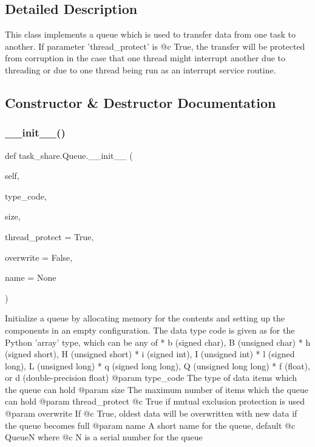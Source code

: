 \subsection{Detailed Description}
\begin{DoxyVerb}This class implements a queue which is used to transfer data from one
task to another. If parameter 'thread_protect' is @c True, the transfer 
will be protected from corruption in the case that one thread might 
interrupt another due to threading or due to one thread being run as an 
interrupt service routine. \end{DoxyVerb}
 

\subsection{Constructor \& Destructor Documentation}
\mbox{\label{classtask__share_1_1_queue_a91ce05bf47c2634013fdb2689c2b207f}} 
\subsubsection{\texorpdfstring{\_\_init\_\_()}{\_\_init\_\_()}}
{\footnotesize\ttfamily def task\+\_\+share.\+Queue.\+\_\+\+\_\+init\+\_\+\+\_\+ (\begin{DoxyParamCaption}\item[{}]{self,  }\item[{}]{type\+\_\+code,  }\item[{}]{size,  }\item[{}]{thread\+\_\+protect = {\ttfamily True},  }\item[{}]{overwrite = {\ttfamily False},  }\item[{}]{name = {\ttfamily None} }\end{DoxyParamCaption})}

\begin{DoxyVerb}Initialize a queue by allocating memory for the contents and 
setting up the components in an empty configuration. The data type 
code is given as for the Python 'array' type, which can be any of
* b (signed char), B (unsigned char)
* h (signed short), H (unsigned short)
* i (signed int), I (unsigned int)
* l (signed long), L (unsigned long)
* q (signed long long), Q (unsigned long long)
* f (float), or d (double-precision float)
@param type_code The type of data items which the queue can hold
@param size The maximum number of items which the queue can hold
@param thread_protect @c True if mutual exclusion protection is used
@param overwrite If @c True, oldest data will be overwritten with new
    data if the queue becomes full 
@param name A short name for the queue, default @c QueueN where @c N
    is a serial number for the queue \end{DoxyVerb}
 

